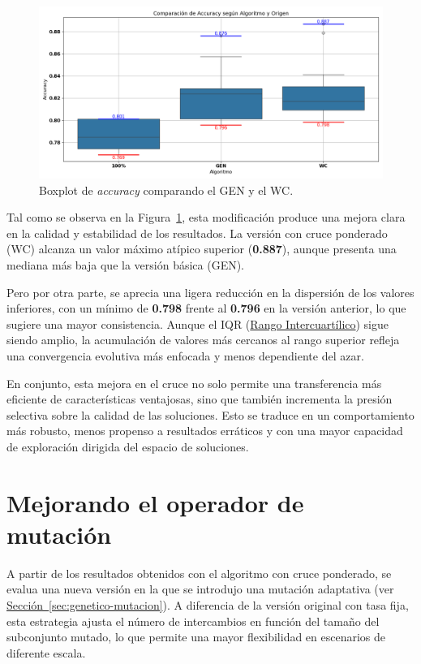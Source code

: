 \begin{figure}[htp]
    \centering
    \includegraphics[width=1\textwidth]{imagenes/evaluaciones/operador-de-cruce}
    \caption{Boxplot de \textit{accuracy} comparando el GEN y el WC.}
    \label{fig:cruce_ponderado}
\end{figure}

Tal como se observa en la Figura~\ref{fig:cruce_ponderado}, esta modificación produce una mejora clara en la calidad y estabilidad de los resultados.
La versión con cruce ponderado (WC) alcanza un valor máximo atípico superior (\textbf{0.887}),
aunque presenta una mediana más baja que la versión básica (GEN).

Pero por otra parte, se aprecia una ligera reducción en la dispersión de los valores inferiores,
con un mínimo de \textbf{0.798} frente al \textbf{0.796} en la versión anterior, lo que sugiere una mayor consistencia.
Aunque el IQR (\hyperref[subsec:visualizacion-de-resultados]{Rango Intercuartílico}) sigue siendo amplio,
la acumulación de valores más cercanos al rango superior refleja una convergencia evolutiva más enfocada y menos dependiente del azar.

En conjunto, esta mejora en el cruce no solo permite una transferencia más eficiente de características ventajosas,
sino que también incrementa la presión selectiva sobre la calidad de las soluciones.
Esto se traduce en un comportamiento más robusto, menos propenso a resultados erráticos y con una mayor capacidad de exploración dirigida del espacio de soluciones.


\section{Mejorando el operador de mutación}\label{sec:mejorando-mutacion}
A partir de los resultados obtenidos con el algoritmo con cruce ponderado, se evalua una nueva versión en la que se introdujo una mutación adaptativa
(ver \hyperref[sec:genetico-mutacion]{Sección~\ref*{sec:genetico-mutacion}}).
A diferencia de la versión original con tasa fija, esta estrategia ajusta el número de intercambios en función del tamaño del subconjunto mutado,
lo que permite una mayor flexibilidad en escenarios de diferente escala.

